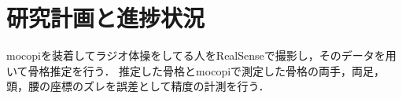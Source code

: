 \documentclass[titlepage]{jarticle}
\begin{document}
%
%
%
%
%

%
%
%
%
\section{研究計画と進捗状況}
%
mocopiを装着してラジオ体操をしてる人をRealSenseで撮影し，そのデータを用いて骨格推定を行う．
推定した骨格とmocopiで測定した骨格の両手，両足，頭，腰の座標のズレを誤差として精度の計測を行う．


%
%
%

%
%
%
%

%
%


%
%
%
%
%
%
%
\end{document}
